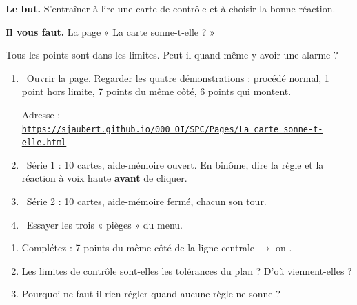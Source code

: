 \documentclass[10pt,a4paper]{article}
\begin{document}
\thispagestyle{fancy}
\begin{tcolorbox}[boite]\textbf{Le but.} S'entraîner à lire une carte de contrôle et à choisir la bonne réaction.\par\textbf{Il vous faut.} La page « La carte sonne-t-elle ? »\end{tcolorbox}
\begin{tcolorbox}[pred]Tous les points sont dans les limites. Peut-il quand même y avoir une alarme ?\reponse\end{tcolorbox}
\begin{enumerate}[label=\textcolor{cyan}{\textbf{\arabic*.}},leftmargin=15pt,itemsep=1.5pt]
\item \tagW\ Ouvrir la page. Regarder les quatre démonstrations : procédé normal, 1 point hors limite, 7 points du même côté, 6 points qui montent.\par Adresse : \href{https://sjaubert.github.io/000_OI/SPC/Pages/La_carte_sonne-t-elle.html}{\nolinkurl{https://sjaubert.github.io/000_OI/SPC/Pages/La_carte_sonne-t-elle.html}}
\item \tagW\ Série 1 : 10 cartes, aide-mémoire ouvert. En binôme, dire la règle et la réaction à voix haute \textbf{avant} de cliquer.
\item \tagW\ Série 2 : 10 cartes, aide-mémoire fermé, chacun son tour.
\item \tagW\ Essayer les trois « pièges » du menu.
\end{enumerate}
\par
{}
\begin{enumerate}[label=\textcolor{cyan}{\textbf{Q\arabic*.}},leftmargin=22pt]
\item Complétez : 7 points du même côté de la ligne centrale $\rightarrow$ on \champ{60mm}.\par\vspace{5pt}
\item Les limites de contrôle sont-elles les tolérances du plan ? D'où viennent-elles ?\reponse[2]
\item Pourquoi ne faut-il rien régler quand aucune règle ne sonne ?\reponse[2]
\end{enumerate}
\end{document}
